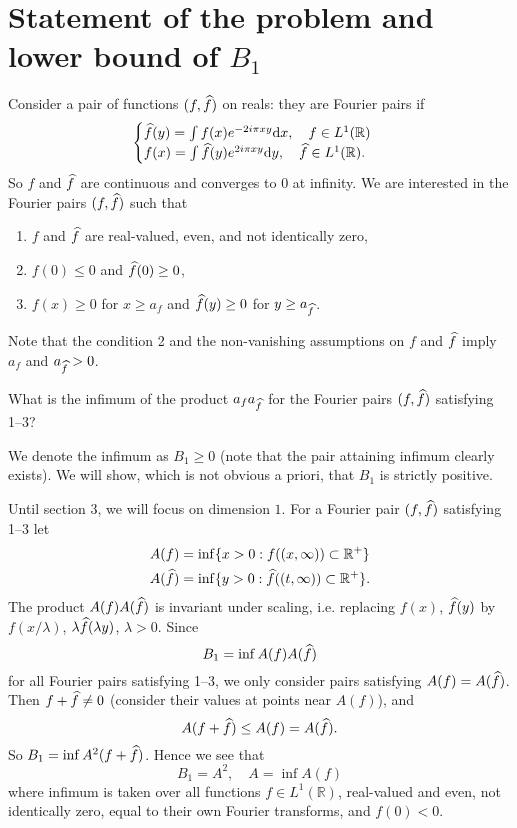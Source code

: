 \section{Statement of the problem and lower bound of $B_{1}$}

Consider a pair of functions $(f, \widehat{f})$ on reals: they are Fourier pairs if
\[
    \begin{cases}
    \widehat{f}(y) = \int f(x) e^{-2 i \pi x y} \mathrm{d} x, \quad f \in L^{1}(\mathbb{R}) \\
    f(x) = \int \widehat{f}(y) e^{2 i \pi x y} \mathrm{d} y, \quad \widehat{f} \in L^{1}(\mathbb{R}).
    \end{cases}
\]
So $f$ and $\widehat{f}$ are continuous and converges to $0$ at infinity.
We are interested in the Fourier pairs $(f, \widehat{f})$ such that
\begin{enumerate}
    \item $f$ and $\widehat{f}$ are real-valued, even, and not identically zero,
    \item $f(0) \leq 0$ and $\widehat{f}(0) \geq 0$,
    \item $f(x) \geq 0$ for $x \geq a_f$ and $\widehat{f}(y) \geq 0$ for $y \geq a_{\widehat{f}}$.
\end{enumerate}
Note that the condition 2 and the non-vanishing assumptions on $f$ and $\widehat{f}$ imply $a_f$ and $a_{\widehat{f}} > 0$.

\begin{problem*}
What is the infimum of the product $a_{f} a_{\widehat{f}}$ for the Fourier pairs $(f, \widehat{f})$ satisfying 1--3?
\end{problem*}

We denote the infimum as $B_1 \geq 0$ (note that the pair attaining infimum clearly exists).
We will show, which is not obvious a priori, that $B_1$ is strictly positive.

Until section 3, we will focus on dimension $1$.
For a Fourier pair $(f, \widehat{f})$ satisfying 1--3 let
\begin{align*}
    A(f) &= \inf\{x > 0: f((x, \infty)) \subset \mathbb{R}^{+}\} \\
    A(\widehat{f}) &= \inf\{y > 0: \widehat{f}((t, \infty)) \subset \mathbb{R}^{+}\} .
\end{align*}
The product $A(f)A(\widehat{f})$ is invariant under scaling, i.e. replacing $f(x)$, $\widehat{f}(y)$ by $f(x /\lambda)$, $\lambda \widehat{f}(\lambda y)$, $\lambda > 0$.
Since
\[
    B_1 = \inf A(f) A(\widehat{f})
\]
for all Fourier pairs satisfying 1--3, we only consider pairs satisfying $A(f) = A(\widehat{f})$.
Then $f + \widehat{f} \neq 0$ (consider their values at points near $A(f)$), and
\[
    A(f + \widehat{f}) \leq A(f) = A(\widehat{f}).
\]
So $B_1 = \inf A^{2}(f + \widehat{f})$. Hence we see that
\[
    B_1 = A^2, \quad A = \inf A(f)
\]
where infimum is taken over all functions $f \in L^{1}(\mathbb{R})$, real-valued and even, not identically zero, equal to their own Fourier transforms, and $f(0) < 0$.

